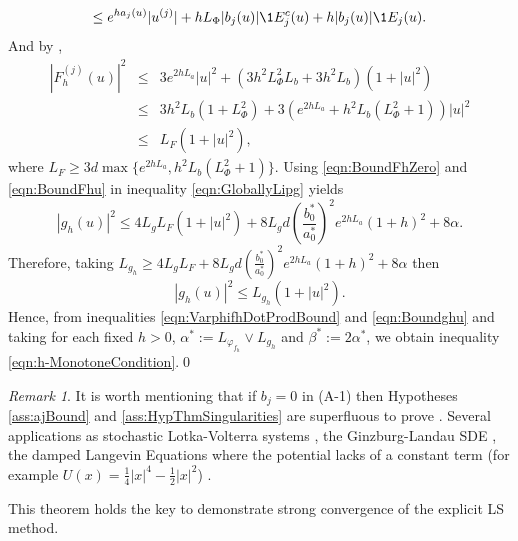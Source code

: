 \documentclass[sort&compress, preprint]{elsarticle}
\theoremstyle{definition}
\theoremstyle{plain}%
\theoremstyle{remark}
\newtheorem{remark}{Remark}[section]
\begin{document}
\begin{pf}
\begin{dmath*}
			\leq
			e^{h a_j(u)} |u^{(j)}| +
			h L_{\Phi} |b_j(u)| \1{E_j^c}(u) +h |b_j(u)| \1{E_j}(u).
	\end{dmath*}
	 And by ,
	\begin{eqnarray}
		|F_h^{(j)}(u)|^2 
		&\leq&
			3 e^{2h L_a }|u|^2 + (3 h^2 L_{\Phi}^2 L_b + 3h^ 2L_b) (1+|u|^2) \nonumber\\
		&\leq&
			3 h^2 L_b (1 + L_{\Phi}^2)   +
			3 \left(
				 e^{2 h L_a} + h^2 L_b (L_{\Phi}^2 + 1 ) 
			\right)|u|^2 \nonumber\\ &\leq& L_F(1+|u|^2), \label{eqn:BoundFhu}
	\end{eqnarray}
	where
	$L_F\geq 3 d \max\{e^{2h L_a},  h^2 L_b(L_{\Phi}^2+1)\}$.
	Using \eqref{eqn:BoundFhZero} and \eqref{eqn:BoundFhu} in  inequality \eqref{eqn:GloballyLipg} yields
	\begin{equation*}
		|g_h(u)|^2 \leq
			4 L_g L_F(1+|u|^2)
			+ 8 L_g d
			\left(
				\frac{b_0^*}{a_0^*}
			\right)^2
			e^{2h L_a} (1+h)^2
			+8 \alpha.
	\end{equation*}
	Therefore, taking
	$
		 L_{g_h} 
		 \geq 
			  4 L_g L_F + 8 L_g d
			  \left(
				  \frac{b_0^*}{a_0^*}
			  \right)^2
			  e^{2h L_a} (1+h)^2
			  +8 \alpha		  
	$
	then
	\begin{equation}\label{eqn:Boundghu}
		|g_h(u)|^2
		\leq
			L_{g_h}(1+|u|^2).		
	\end{equation}
	Hence, from inequalities \eqref{eqn:VarphifhDotProdBound} and \eqref{eqn:Boundghu} 
	and taking for each fixed $h>0$, $\alpha^* := L_{\varphi_{f_h}}\vee L_{g_h}$ and
	$\beta^* := 2\alpha^*$, we obtain inequality  \eqref{eqn:h-MonotoneCondition}.\qed
\end{pf}
%
\begin{remark}\label{rmk:PertrubedSDE}
	It is worth mentioning that if $b_j=0$ in (A-1) 
	then Hypotheses \ref{ass:ajBound} and \ref{ass:HypThmSingularities} are superfluous to 
	prove . Several  applications  as  stochastic
	Lotka-Volterra systems \cite{Mao2002,Mao2003},  
	the Ginzburg-Landau SDE \cite[Sec. 4.4]{Kloeden1992},
	the damped Langevin Equations where the potential lacks of a constant term 
	(for example $U(x) = \frac{1}{4}|x|^4 - \frac{1}{2}|x|^2$) \cite{Hutzenthaler2012a}.
\end{remark}

This theorem holds the key to demonstrate strong convergence of the explicit LS method. 


\end{document}

